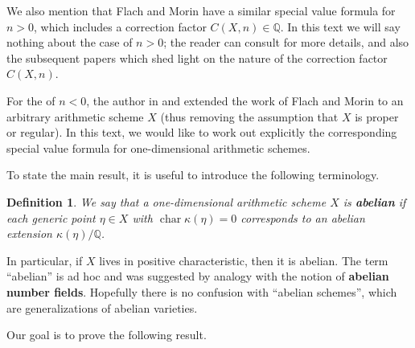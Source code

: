 \documentclass[draft]{article}
\DeclareMathOperator{\fchar}{char}
\newcommand{\QQ}{\mathbb{Q}}
\theoremstyle{myplain}
\theoremstyle{mydefinition}
\newtheorem{definition}[theorem]{Definition}
\numberwithin{equation}{section}
\begin{document}
We also mention that Flach and Morin have a similar special value formula for
$n > 0$, which includes a correction factor $C (X,n) \in \QQ$. In this text we
will say nothing about the case of $n > 0$; the reader can consult
\cite{Flach-Morin-2018} for more details, and also the subsequent papers
\cite{Flach-Morin-2020,Flach-Morin-2020-Muenster,Morin-2021-THH} which shed
light on the nature of the correction factor $C (X,n)$.

For the of $n < 0$, the author in \cite{Beshenov-Weil-etale-1} and
\cite{Beshenov-Weil-etale-2} extended the work of Flach and Morin
\cite{Flach-Morin-2018} to an arbitrary arithmetic scheme $X$ (thus removing the
assumption that $X$ is proper or regular). In this text, we would like to work
out explicitly the corresponding special value formula for one-dimensional
arithmetic schemes.

\vspace{1em}

To state the main result, it is useful to introduce the following terminology.

\begin{definition}
  \label{dfn:abelian-scheme}
  We say that a one-dimensional arithmetic scheme $X$ is \textbf{abelian} if
  each generic point $\eta \in X$ with $\fchar \kappa (\eta) = 0$ corresponds to
  an abelian extension $\kappa (\eta)/\QQ$.
\end{definition}

In particular, if $X$ lives in positive characteristic, then it is abelian. The term ``abelian'' is ad hoc and was suggested by analogy with the
notion of \textbf{abelian number fields}. Hopefully there is no confusion with
``abelian schemes'', which are generalizations of abelian varieties.

Our goal is to prove the following result.
\end{document}

